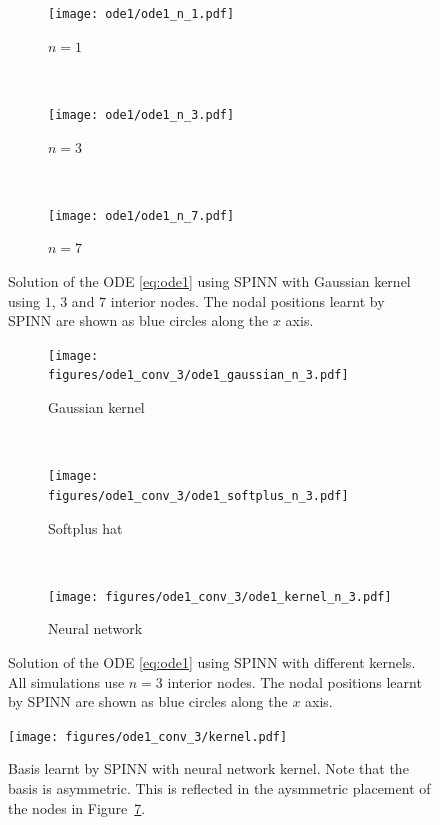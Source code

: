 \documentclass[12pt]{article}
\begin{document}
\begin{figure}
\centering
\begin{subfigure}{0.3\textwidth}
\texttt{[image: ode1/ode1\_n\_1.pdf]}
\caption{$n = 1$}
\label{fig:ode1_n_1}
\end{subfigure}
~
\begin{subfigure}{0.3\textwidth}
\texttt{[image: ode1/ode1\_n\_3.pdf]}
\caption{$n = 3$}
\label{fig:ode1_n_3}
\end{subfigure}
~
\begin{subfigure}{0.3\textwidth}
\texttt{[image: ode1/ode1\_n\_7.pdf]}
\caption{$n = 7$}
\label{fig:ode1_n_7}
\end{subfigure}
\caption{Solution of the ODE \eqref{eq:ode1} using SPINN with Gaussian kernel using $1$, $3$ and $7$ interior nodes. The nodal positions learnt by SPINN are shown as blue circles along the $x$ axis.}
\label{fig:spinn_ode_1}
\end{figure}

\begin{figure}
\centering
\begin{subfigure}{0.3\textwidth}
\texttt{[image: figures/ode1\_conv\_3/ode1\_gaussian\_n\_3.pdf]}
\caption{Gaussian kernel}
\label{fig:ode1_n_3_gaussian}
\end{subfigure}
~
\begin{subfigure}{0.3\textwidth}
\texttt{[image: figures/ode1\_conv\_3/ode1\_softplus\_n\_3.pdf]}
\caption{Softplus hat}
\label{fig:ode1_n_3_softplus}
\end{subfigure}
~
\begin{subfigure}{0.3\textwidth}
\texttt{[image: figures/ode1\_conv\_3/ode1\_kernel\_n\_3.pdf]}
\caption{Neural network}
\label{fig:ode1_n_3_kernel}
\end{subfigure}
\caption{Solution of the ODE \eqref{eq:ode1} using SPINN with different kernels. All simulations use $n = 3$ interior nodes. The nodal positions learnt by SPINN are shown as blue circles along the $x$ axis.}
\label{fig:spinn_ode_1_kernels}
\end{figure}

\begin{figure}
\centering
\texttt{[image: figures/ode1\_conv\_3/kernel.pdf]}
\caption{Basis learnt by SPINN with neural network kernel. Note that the basis is asymmetric. This is reflected in the aysmmetric placement of the nodes in Figure~\ref{fig:ode1_n_3_kernel}.}
\label{fig:ode1_kernel}
\end{figure}
\end{document}
